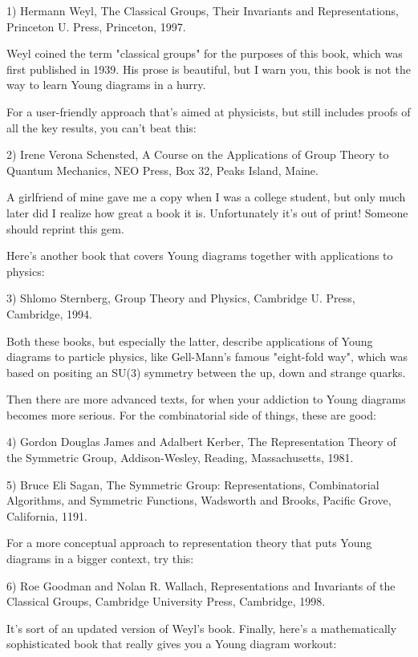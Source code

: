 1) Hermann Weyl, The Classical Groups, Their Invariants and Representations,
Princeton U. Press, Princeton, 1997.

Weyl coined the term "classical groups" for the purposes of this book,
which was first published in 1939.  His prose is beautiful, but I warn
you, this book is not the way to learn Young diagrams in a hurry.

For a user-friendly approach that's aimed at physicists, but still
includes proofs of all the key results, you can't beat this:

2) Irene Verona Schensted, A Course on the Applications of Group Theory
to Quantum Mechanics, NEO Press, Box 32, Peaks Island, Maine.

A girlfriend of mine gave me a copy when I was a college student, but
only much later did I realize how great a book it is.  Unfortunately
it's out of print!  Someone should reprint this gem.

Here's another book that covers Young diagrams together with applications
to physics:

3) Shlomo Sternberg, Group Theory and Physics, Cambridge U. Press,
Cambridge, 1994.

Both these books, but especially the latter, describe applications of
Young diagrams to particle physics, like Gell-Mann's famous "eight-fold
way", which was based on positing an SU(3) symmetry between the up, down
and strange quarks.

Then there are more advanced texts, for when your addiction to Young
diagrams becomes more serious.  For the combinatorial side of things,
these are good:

4) Gordon Douglas James and Adalbert Kerber, The Representation Theory 
of the Symmetric Group, Addison-Wesley, Reading, Massachusetts, 1981.

5) Bruce Eli Sagan, The Symmetric Group: Representations, Combinatorial 
Algorithms, and Symmetric Functions, Wadsworth and Brooks, Pacific Grove,
California, 1191.

For a more conceptual approach to representation theory that puts Young
diagrams in a bigger context, try this:

6) Roe Goodman and Nolan R. Wallach, Representations and Invariants of the 
Classical Groups, Cambridge University Press, Cambridge, 1998.

It's sort of an updated version of Weyl's book.  Finally, here's
a mathematically sophisticated book that really gives you a Young
diagram workout:

